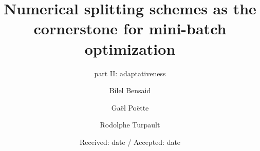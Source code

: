 \newcommand{\Frac}[2]{\displaystyle \frac{#1}{#2}\otimes }
\newcommand{\BlackBox}{\rule{1.5ex}{1.5ex}}

\newcommand{\polyTwo}{PolyGlobalMild }
\newcommand{\polyThree}{PolyLocalMild }
\newcommand{\polyFour}{PolyGlobalStiff }
\newcommand{\polyFive}{PolyAllStiff }

\newcommand{\exOne}{$"2Gen"$ }
\newcommand{\exTwo}{$"2Ego>Gen"$ }
\newcommand{\exThree}{$"2Ego<Eq<Gen"$ }
\newcommand{\exFour}{$"2Ego\ll Gen"$ }
\newcommand{\exFive}{$"3Gen"$ }
\newcommand{\exSix}{$"3Ego<2Plot\approx Gen"$ }
\newcommand{\exSeven}{$"3Ego\ll Gen"$ }
\newcommand{\exHeight}{$"4Ego<2Plot<Gen"$ }

\newcommand{\mg}{gm} %
\newcommand{\ml}{lm}
\newcommand{\ps}{sp}






\title{Numerical splitting schemes as the cornerstone for mini-batch optimization}
\subtitle{part II: adaptativeness}


\author{Bilel Bensaid     \and
		Ga\"el Po\"ette   \and
        Rodolphe Turpault
}



\date{Received: date / Accepted: date}


\maketitle

